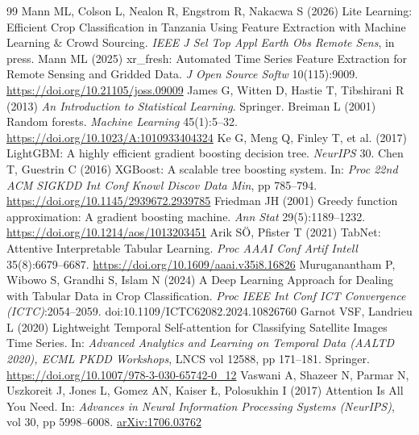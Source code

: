 \documentclass[journal]{IEEEtran}
\begin{document}
\begin{thebibliography}{99}
Mann ML, Colson L, Nealon R, Engstrom R, Nakacwa S (2026) Lite Learning: Efficient Crop Classification in Tanzania Using Feature Extraction with Machine Learning \& Crowd Sourcing. \textit{IEEE J Sel Top Appl Earth Obs Remote Sens}, in press.
Mann ML (2025) xr\_fresh: Automated Time Series Feature Extraction for Remote Sensing and Gridded Data. \textit{J Open Source Softw} 10(115):9009. \href{https://doi.org/10.21105/joss.09009}{https://doi.org/10.21105/joss.09009}
James G, Witten D, Hastie T, Tibshirani R (2013) \textit{An Introduction to Statistical Learning}. Springer.
Breiman L (2001) Random forests. \textit{Machine Learning} 45(1):5--32. \href{https://doi.org/10.1023/A:1010933404324}{https://doi.org/10.1023/A:1010933404324}
Ke G, Meng Q, Finley T, et al. (2017) LightGBM: A highly efficient gradient boosting decision tree. \textit{NeurIPS} 30.
Chen T, Guestrin C (2016) XGBoost: A scalable tree boosting system. In: \textit{Proc 22nd ACM SIGKDD Int Conf Knowl Discov Data Min}, pp 785--794. \href{https://doi.org/10.1145/2939672.2939785}{https://doi.org/10.1145/2939672.2939785}
Friedman JH (2001) Greedy function approximation: A gradient boosting machine. \textit{Ann Stat} 29(5):1189--1232. \href{https://doi.org/10.1214/aos/1013203451}{https://doi.org/10.1214/aos/1013203451}
Arik SÖ, Pfister T (2021) TabNet: Attentive Interpretable Tabular Learning. \textit{Proc AAAI Conf Artif Intell} 35(8):6679--6687. \href{https://doi.org/10.1609/aaai.v35i8.16826}{https://doi.org/10.1609/aaai.v35i8.16826}
Muruganantham P, Wibowo S, Grandhi S, Islam N (2024) A Deep Learning Approach for Dealing with Tabular Data in Crop Classification. \textit{Proc IEEE Int Conf ICT Convergence (ICTC)}:2054--2059. doi:10.1109/ICTC62082.2024.10826760
Garnot VSF, Landrieu L (2020) Lightweight Temporal Self-attention for Classifying Satellite Images Time Series. In: \textit{Advanced Analytics and Learning on Temporal Data (AALTD 2020), ECML PKDD Workshops}, LNCS vol 12588, pp 171--181. Springer. \href{https://doi.org/10.1007/978-3-030-65742-0_12}{https://doi.org/10.1007/978-3-030-65742-0\_12}
Vaswani A, Shazeer N, Parmar N, Uszkoreit J, Jones L, Gomez AN, Kaiser \L{}, Polosukhin I (2017) Attention Is All You Need. In: \textit{Advances in Neural Information Processing Systems (NeurIPS)}, vol 30, pp 5998--6008. \href{https://arxiv.org/abs/1706.03762}{arXiv:1706.03762}

\end{thebibliography}
\end{document}
